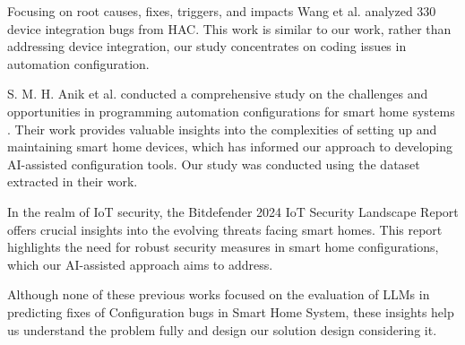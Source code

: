 Focusing on root causes, fixes, triggers, and impacts Wang et al. \cite{10.1145/3533767.3534365} analyzed 330 device integration bugs from HAC. This work is similar to our work, rather than addressing device integration, our study concentrates on coding issues in automation configuration.

S. M. H. Anik et al. \cite{Anik2018} conducted a comprehensive study on the challenges and opportunities in programming automation configurations for smart home systems \cite{inproceedings}. Their work provides valuable insights into the complexities of setting up and maintaining smart home devices, which has informed our approach to developing AI-assisted configuration tools. Our study was conducted using the dataset extracted in their work.

In the realm of IoT security, the Bitdefender 2024 IoT Security Landscape Report\cite{Bitdefender} offers crucial insights into the evolving threats facing smart homes. This report highlights the need for robust security measures in smart home configurations, which our AI-assisted approach aims to address.
 
Although none of these previous works focused on the evaluation of LLMs in predicting
fixes of Configuration bugs in Smart Home System, these insights help us understand the problem fully and design our solution design considering it.